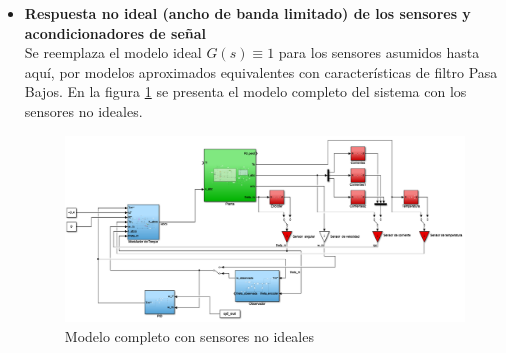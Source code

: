 \documentclass[10pt]{article}
\begin{document}
\begin{itemize}
\item \textbf{Respuesta no ideal (ancho de banda limitado) de los sensores y acondicionadores de señal}\\
Se reemplaza el modelo ideal $G(s)\equiv 1$ para los sensores asumidos hasta aquí, por modelos aproximados equivalentes con características de filtro Pasa Bajos. En la figura \ref{fig:modelocompleto} se presenta el modelo completo del sistema con los sensores no ideales.\\

 \begin{figure}[h!]
	\centering
	\includegraphics[width=\textwidth]{modelocompleto.png}
	\caption{\label{fig:modelocompleto} Modelo completo con sensores no ideales}
	\end{figure}
	

\end{itemize}
\end{document}
